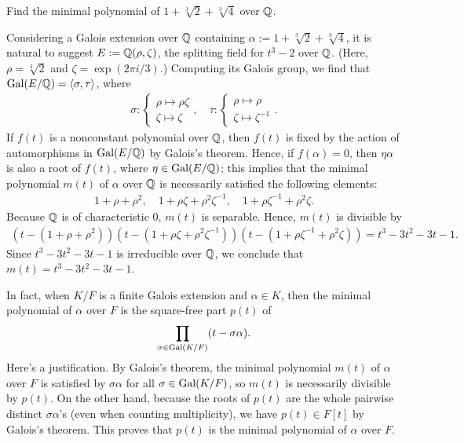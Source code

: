\begin{prob}
    Find the minimal polynomial of $1+\sqrt[3]{2}+\sqrt[3]{4}$ over ${\mathbb{Q}}$.
\end{prob}
\begin{sol}
    Considering a Galois extension over ${\mathbb{Q}}$ containing $\alpha:=1+\sqrt[3]{2}+\sqrt[3]{4}$, it is natural to suggest $E:={\mathbb{Q}}(\rho, \zeta)$, the splitting field for $t^3-2$ over ${\mathbb{Q}}$. (Here, $\rho=\sqrt[3]{2}$ and $\zeta=\exp(2\pi i/3)$.)
    Computing its Galois group, we find that ${\textrm{Gal}({E/{\mathbb{Q}}})}={\left\langle{\sigma, \tau}\right\rangle}$, where
    \begin{align*}
        \sigma:\left\{\begin{array}{c}
            \rho\mapsto\rho\zeta\\
            \zeta\mapsto\zeta
        \end{array}\right.,\quad
        \tau:\left\{\begin{array}{c}
            \rho\mapsto\rho\\
            \zeta\mapsto\zeta^{-1}
        \end{array}\right..
    \end{align*}
    If $f(t)$ is a nonconstant polynomial over ${\mathbb{Q}}$, then $f(t)$ is fixed by the action of automorphisms in ${\textrm{Gal}({E/{\mathbb{Q}}})}$ by Galois's theorem.
    Hence, if $f(\alpha)=0$, then $\eta\alpha$ is also a root of $f(t)$, where $\eta\in{\textrm{Gal}({E/{\mathbb{Q}}})}$; this implies that the minimal polynomial $m(t)$ of $\alpha$ over ${\mathbb{Q}}$ is necessarily satisfied the following elements:
    \begin{align*}
        1+\rho+\rho^2,\quad 1+\rho\zeta+\rho^2\zeta^{-1},\quad 1+\rho\zeta^{-1}+\rho^2\zeta.
    \end{align*}
    Because ${\mathbb{Q}}$ is of characteristic 0, $m(t)$ is separable.
    Hence, $m(t)$ is divisible by
    \begin{align*}
        (t-(1+\rho+\rho^2))(t-(1+\rho\zeta+\rho^2\zeta^{-1}))(t-(1+\rho\zeta^{-1}+\rho^2\zeta))=t^3-3t^2-3t-1.
    \end{align*}
    Since $t^3-3t^2-3t-1$ is irreducible over ${\mathbb{Q}}$, we conclude that $m(t)=t^3-3t^2-3t-1$.
\end{sol}
\begin{rmk}
    In fact, when $K/F$ is a finite Galois extension and $\alpha\in K$, then the minimal polynomial of $\alpha$ over $F$ is the square-free part $p(t)$ of
    \begin{align*}
        \prod_{\sigma\in{\textrm{Gal}({K/F})}}(t-\sigma\alpha).
    \end{align*}
    Here's a justification.
    By Galois's theorem, the minimal polynomial $m(t)$ of $\alpha$ over $F$ is satisfied by $\sigma\alpha$ for all $\sigma\in{\textrm{Gal}({K/F})}$, so $m(t)$ is necessarily divisible by $p(t)$.
    On the other hand, because the roots of $p(t)$ are the whole pairwise distinct $\sigma\alpha$'s (even when counting multiplicity), we have $p(t)\in F[t]$ by Galois's theorem.
    This proves that $p(t)$ is the minimal polynomial of $\alpha$ over $F$.
\end{rmk}

